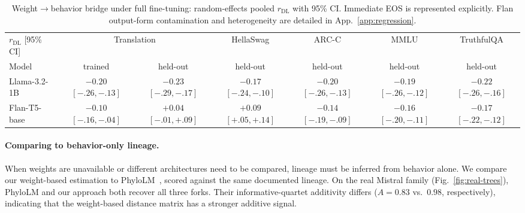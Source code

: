 \documentclass{article}
\theoremstyle{definition}
\theoremstyle{plain}
\begin{document}
\begin{table}[t]
\caption{Weight$\to$behavior bridge under full fine-tuning: random-effects pooled
  $r_{\mathrm{DL}}$ with 95\% CI. Immediate EOS is represented explicitly. Flan output-form
  contamination and heterogeneity are detailed in App.~\ref{app:regression}.}
\label{tab:behavior_holdout}
\centering
\small
\setlength{\tabcolsep}{5pt}
\begin{tabular}{lcccccc}
\toprule
$r_{\mathrm{DL}}$ [95\% CI] & \multicolumn{2}{c}{Translation} & HellaSwag & ARC-C & MMLU & TruthfulQA \\
\cmidrule(lr){2-3}
Model & trained & held-out & held-out & held-out & held-out & held-out \\
\midrule
Llama-3.2-1B & \shortstack{$-0.20$\\{\scriptsize$[-.26,-.13]$}} & \shortstack{$-0.23$\\{\scriptsize$[-.29,-.17]$}} & \shortstack{$-0.17$\\{\scriptsize$[-.24,-.10]$}} & \shortstack{$-0.20$\\{\scriptsize$[-.26,-.13]$}} & \shortstack{$-0.19$\\{\scriptsize$[-.26,-.12]$}} & \shortstack{$-0.22$\\{\scriptsize$[-.26,-.16]$}} \\
\addlinespace
Flan-T5-base & \shortstack{$-0.10$\\{\scriptsize$[-.16,-.04]$}} & \shortstack{$+0.04$\\{\scriptsize$[-.01,+.09]$}} & \shortstack{$+0.09$\\{\scriptsize$[+.05,+.14]$}} & \shortstack{$-0.14$\\{\scriptsize$[-.19,-.09]$}} & \shortstack{$-0.16$\\{\scriptsize$[-.20,-.11]$}} & \shortstack{$-0.17$\\{\scriptsize$[-.22,-.12]$}} \\
\bottomrule
\end{tabular}
\end{table}


\paragraph{Comparing to behavior-only lineage.}
\label{sec:results:blackbox}

When weights are unavailable or different architectures need to be compared, lineage must be inferred from behavior alone. We compare our weight-based
estimation to PhyloLM~\citep{yax2025phylolm}, scored against the
same documented lineage. On the real Mistral family (Fig.~\ref{fig:real-trees}), PhyloLM and our approach
both recover all three forks. Their informative-quartet additivity differs ($A=0.83$ vs.\ $0.98$, respectively), indicating that the weight-based distance matrix has a stronger additive signal.
\end{document}

